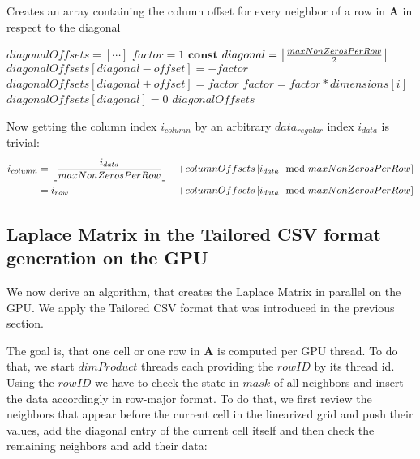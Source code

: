 \begin{algorithm}
\caption{Creates an array containing the column offset for every neighbor of a row in \textbf{A} in respect to the diagonal}\label{diagonalOffsets}
\begin{algorithmic}[1]
	\State $diagonalOffsets = \left[ \cdots \right]$  
	\State $factor = 1$
	\State $\mathbf{const}$ $diagonal = \floor*{\frac{maxNonZerosPerRow}{2}}$
	\State 
    	\State $diagonalOffsets[diagonal - offset] = -factor$
        \State $diagonalOffsets[diagonal + offset] = factor$
        \State $factor = factor * dimensions[i]$
	\EndFor
	\State $diagonalOffsets[diagonal] = 0$
	\State \Return $diagonalOffsets$
	
\EndFunction
\end{algorithmic}
\end{algorithm}
Now getting the column index $i_{column}$ by an arbitrary $data_{regular}$ index $i_{data}$ is trivial:
\begin{equation}
\begin{aligned}
	i_{column} & = \floor*{\frac{i_{data}}{maxNonZerosPerRow}} & + columnOffsets\left[ i_{data} \mod maxNonZerosPerRow \right]\\
			   & = i_{row} & + columnOffsets\left[ i_{data} \mod maxNonZerosPerRow \right]\\
\end{aligned}
\end{equation}


\subsection{Laplace Matrix in the Tailored CSV format generation on the GPU}\label{laplace-creation}
We now derive an algorithm, that creates the Laplace Matrix in parallel on the GPU. We apply the Tailored CSV format that was introduced in the previous section. 
\par The goal is, that one cell or one row in \textbf{A} is computed per GPU thread. To do that, we start $dimProduct$ threads each providing the $rowID$ by its thread id. Using the $rowID$ we have to check the state in $mask$ of all neighbors and insert the data accordingly in row-major format. To do that, we first review the neighbors that appear before the current cell in the linearized grid and push their values, add the diagonal entry of the current cell itself and then check the remaining neighbors and add their data:

